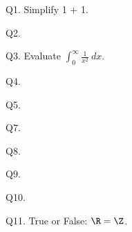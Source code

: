 


\renewcommand\COURSENAME{[This is long form of the course name]}
\renewcommand\COURSESHORTNAME{[Short course name]}
\renewcommand\COURSENUMBER{CISS999}
\renewcommand\TITLE{Assignment 42}


\topmatter

Q1. Simplify 1 + 1.

Q2. \lipsum[1-2]

Q3. Evaluate $\int_0^\infty \frac{1}{x^2} \ dx$.

Q4. \lipsum[3-5]

Q5. \lipsum[6]

Q7. \lipsum[7-8]

Q8. \lipsum[9]

Q9. \lipsum[10-11]

Q10. \lipsum[10-12]

Q11. True or False: $\R = \Z$.


